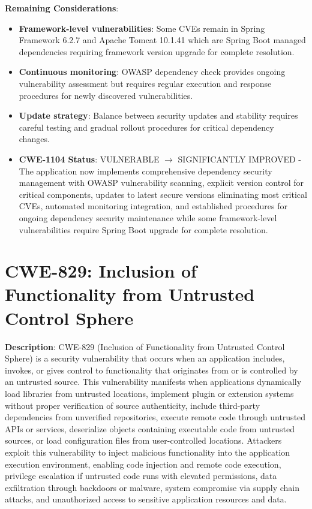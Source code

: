 \documentclass[]{UCD_CS_FYP_Report}
\begin{document}
\textbf{Remaining Considerations}:
\begin{itemize}
	\item \textbf{Framework-level vulnerabilities}: Some CVEs remain in Spring Framework 6.2.7 and Apache Tomcat 10.1.41 which are Spring Boot managed dependencies requiring framework version upgrade for complete resolution.
	\item \textbf{Continuous monitoring}: OWASP dependency check provides ongoing vulnerability assessment but requires regular execution and response procedures for newly discovered vulnerabilities.
	\item \textbf{Update strategy}: Balance between security updates and stability requires careful testing and gradual rollout procedures for critical dependency changes.
\end{itemize}

\begin{itemize}
	\item \textbf{CWE-1104 Status}: VULNERABLE $\rightarrow$ SIGNIFICANTLY IMPROVED - The application now implements comprehensive dependency security management with OWASP vulnerability scanning, explicit version control for critical components, updates to latest secure versions eliminating most critical CVEs, automated monitoring integration, and established procedures for ongoing dependency security maintenance while some framework-level vulnerabilities require Spring Boot upgrade for complete resolution.
\end{itemize}

\section{CWE-829: Inclusion of Functionality from Untrusted Control Sphere}

\textbf{Description}: CWE-829 (Inclusion of Functionality from Untrusted Control Sphere) is a security vulnerability that occurs when an application includes, invokes, or gives control to functionality that originates from or is controlled by an untrusted source. This vulnerability manifests when applications dynamically load libraries from untrusted locations, implement plugin or extension systems without proper verification of source authenticity, include third-party dependencies from unverified repositories, execute remote code through untrusted APIs or services, deserialize objects containing executable code from untrusted sources, or load configuration files from user-controlled locations. Attackers exploit this vulnerability to inject malicious functionality into the application execution environment, enabling code injection and remote code execution, privilege escalation if untrusted code runs with elevated permissions, data exfiltration through backdoors or malware, system compromise via supply chain attacks, and unauthorized access to sensitive application resources and data.
\end{document}
